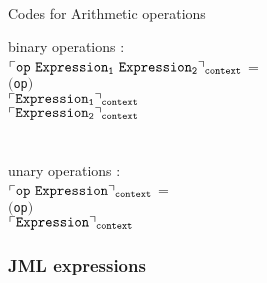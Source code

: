 \begin{appendix}
\begin{center}
\begin{tabular}{|c|c|}
\end{tabular}\\[2 mm]
Codes for Arithmetic operations
\end{center}
binary operations : \\
$\ulcorner \tt{ op \ Expression_1 \ Expression_2 } \urcorner_{\tt{context}} $ = \\
\phantom{..............................................} \code \texttt{$($op$ ) $} \\
\phantom{..............................................} $ \ulcorner  \tt{  Expression_1 }  \urcorner_{\tt{context}}$ \\
\phantom{..............................................} $\ulcorner \tt{ Expression_2 } \urcorner_{\tt{context}}$ \\\\\\


unary operations : \\
$\ulcorner \tt{ op \ Expression }   \urcorner_{\tt{context}}$ = \\
\phantom{..................................... }\code \texttt{$($op$)$} \\
\phantom{.....................................} $\ulcorner \tt{Expression}  \urcorner_{\tt{context}} $\\


\subsubsection{JML expressions}


\end{appendix}
